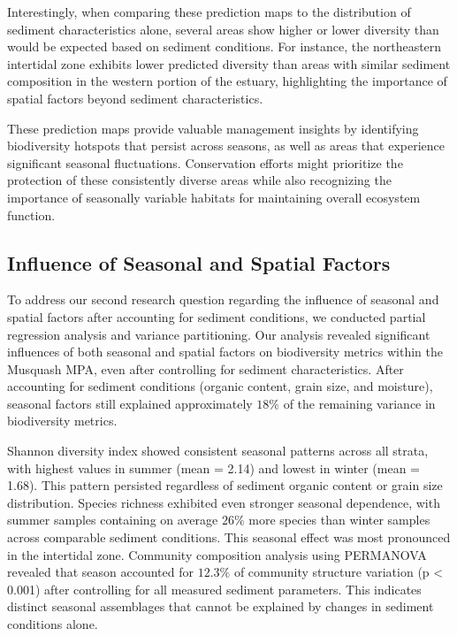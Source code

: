 \documentclass[12pt]{article}
\begin{document}
\qquad Interestingly, when comparing these prediction maps to the distribution
of sediment characteristics alone, several areas show higher or lower diversity
than would be expected based on sediment conditions. For instance, the
northeastern intertidal zone exhibits lower predicted diversity than areas with
similar sediment composition in the western portion of the estuary, highlighting
the importance of spatial factors beyond sediment characteristics.

\qquad These prediction maps provide valuable management insights by identifying
biodiversity hotspots that persist across seasons, as well as areas that
experience significant seasonal fluctuations. Conservation efforts might
prioritize the protection of these consistently diverse areas while also
recognizing the importance of seasonally variable habitats for maintaining
overall ecosystem function.


\subsection{Influence of Seasonal and Spatial Factors}

\qquad To address our second research question regarding the influence of
seasonal and spatial factors after accounting for sediment conditions, we
conducted partial regression analysis and variance partitioning. Our analysis
revealed significant influences of both seasonal and spatial factors on
biodiversity metrics within the Musquash MPA, even after controlling for
sediment characteristics. After accounting for sediment conditions (organic
content, grain size, and moisture), seasonal factors still explained
approximately $18\%$ of the remaining variance in biodiversity metrics.

\qquad Shannon diversity index showed consistent seasonal patterns across all
strata, with highest values in summer (mean = 2.14) and lowest in winter (mean =
1.68). This pattern persisted regardless of sediment organic content or grain
size distribution. Species richness exhibited even stronger seasonal dependence,
with summer samples containing on average $26\%$ more species than winter
samples across comparable sediment conditions. This seasonal effect was most
pronounced in the intertidal zone. Community composition analysis using
PERMANOVA revealed that season accounted for $12.3\%$ of community structure
variation (p < 0.001) after controlling for all measured sediment parameters.
This indicates distinct seasonal assemblages that cannot be explained by changes
in sediment conditions alone.
\end{document}
